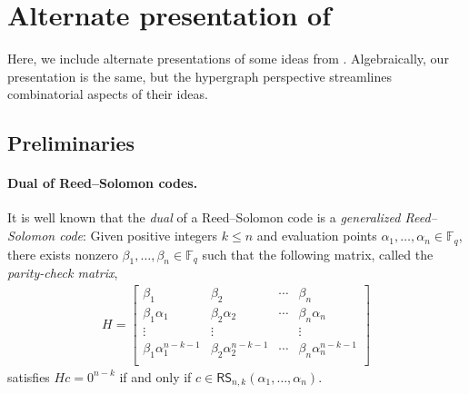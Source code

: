 \documentclass{article}[11pt]
\def\RS{\mathsf{RS}}
\begin{document}



\appendix

\section{Alternate presentation of \cite{BGM23}}
\label{app:bgm}
Here, we include alternate presentations of some ideas from \cite{BGM23}.
Algebraically, our presentation is the same, but the hypergraph perspective streamlines combinatorial aspects of their ideas.

\subsection{Preliminaries}
\paragraph{Dual of Reed--Solomon codes.}
It is well known that the \emph{dual} of a Reed--Solomon code is a \emph{generalized Reed--Solomon code}: Given positive integers $k \le n$ and evaluation points $\alpha_1,\dots,\alpha_n \in \mathbb{F}_q$, there exists nonzero $\beta_1,\dots,\beta_n\in\mathbb{F}_q$ such that the following matrix, called the \emph{parity-check matrix},
\begin{align}
  H = 
    \begin{bmatrix}
      \beta_1 & \beta_2 & \cdots & \beta_n \\
      \beta_1\alpha_1 & \beta_2\alpha_2 & \cdots & \beta_n\alpha_n \\
      \vdots &\vdots&&\vdots \\
      \beta_1\alpha_1^{n-k-1} & \beta_2\alpha_2^{n-k-1} & \cdots & \beta_n\alpha_n^{n-k-1} \\
    \end{bmatrix}
    \label{eq:rs-h}
\end{align}
satisfies $Hc = 0^{n-k}$ if and only if $c\in \RS_{n,k}(\alpha_1,\dots,\alpha_n)$.
\end{document}
